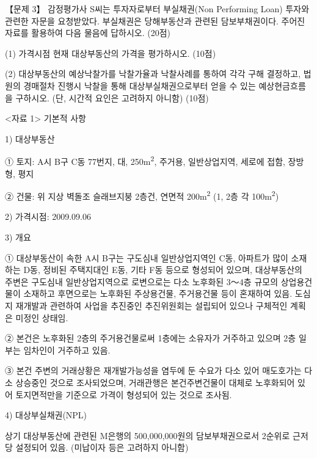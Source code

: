\begin{longquestion}{【문제 3】}
감정평가사 S씨는 투자자로부터 부실채권(Non Performing Loan) 투자와 관련한 자문을 요청받았다. 부실채권은 당해부동산과 관련된 담보부채권이다. 주어진 자료를 활용하여 다음 물음에 답하시오. (20점) \par
\medskip\noindent (1) 가격시점 현재 대상부동산의 가격을 평가하시오. (10점) \par
\medskip\noindent (2) 대상부동산의 예상낙찰가를 낙찰가율과 낙찰사례를 통하여 각각 구해 결정하고, 법원의 경매절차 진행시 낙찰을 통해 대상부실채권으로부터 얻을 수 있는 예상현금흐름을 구하시오. (단, 시간적 요인은 고려하지 아니함) (10점) \par
<자료 1> 기본적 사항 \par
1) 대상부동산 \par
① 토지: A시 B구 C동 77번지, 대, 250m\textsuperscript{2}, 주거용, 일반상업지역, 세로에 접함, 장방형, 평지 \par
② 건물: 위 지상 벽돌조 슬래브지붕 2층건, 연면적 200m\textsuperscript{2} (1, 2층 각 100m\textsuperscript{2}) \par
2) 가격시점: 2009.09.06 \par
3) 개요 \par
① 대상부동산이 속한 A시 B구는 구도심내 일반상업지역인 C동, 아파트가 많이 소재하는 D동, 정비된 주택지대인 E동, 기타 F동 등으로 형성되어 있으며, 대상부동산의 주변은 구도심내 일반상업지역으로 로변으로는 다소 노후화된 3～4층 규모의 상업용건물이 소재하고 후면으로는 노후화된 주상용건물, 주거용건물 등이 혼재하여 있음. 도심지 재개발과 관련하여 사업을 추진중인 추진위원회는 설립되어 있으나 구체적인 계획은 미정인 상태임. \par
② 본건은 노후화된 2층의 주거용건물로써 1층에는 소유자가 거주하고 있으며 2층 일부는 임차인이 거주하고 있음. \par
③ 본건 주변의 거래상황은 재개발가능성을 염두에 둔 수요가 다소 있어 매도호가는 다소 상승중인 것으로 조사되었으며, 거래관행은 본건주변건물이 대체로 노후화되어 있어 토지면적만을 기준으로 가격이 형성되어 있는 것으로 조사됨. \par
4) 대상부실채권(NPL) \par
상기 대상부동산에 관련된 M은행의 500,000,000원의 담보부채권으로서 2순위로 근저당 설정되어 있음. (미납이자 등은 고려하지 아니함) \par

\end{longquestion}
